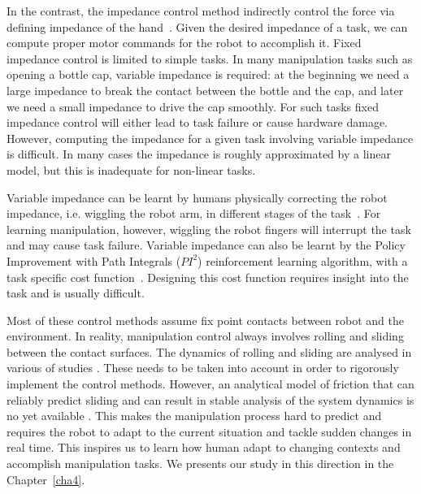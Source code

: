 In the contrast, the impedance control method indirectly control the force via defining impedance of the hand~\citep{howard2010transferring,wimbock2012comparison}. Given the desired impedance of a task, we can compute proper motor commands for the robot to accomplish it. Fixed impedance control is limited to simple tasks. In many manipulation tasks such as opening a bottle cap, variable impedance is required: at the beginning we need a large impedance to break the contact between the bottle and the cap, and later we need a small impedance to drive the cap smoothly. For such tasks fixed impedance control will either lead to task failure or cause hardware damage.
However, computing the impedance for a given task involving variable impedance is difficult.
In many cases the impedance is roughly approximated by a linear model, but this is inadequate for non-linear tasks.

Variable impedance can be learnt by humans physically correcting the robot impedance, i.e. wiggling the robot arm, in different stages of the task~\citep{kronander2012online}. For learning manipulation, however, wiggling the robot fingers will interrupt the task and may cause task failure.
Variable impedance can also be learnt by the Policy Improvement with Path Integrals ($PI^2$) reinforcement learning algorithm, with a task specific cost function~\citep{buchli2011learning}. Designing this cost function requires insight into the task and is usually difficult.

Most of these control methods assume fix point contacts between robot and the environment. In reality, manipulation control always involves rolling and sliding between the contact surfaces. The dynamics of rolling and sliding are analysed in various of studies \citep{howe1988sliding,montana1988kinematics}. These needs to be taken into account in order to rigorously implement the control methods. However, an analytical model of friction that can reliably predict sliding and can result in stable analysis of the system dynamics is no yet available \citep{bicchi2001robotic}. This makes the manipulation process hard to predict and requires the robot to adapt to the current situation and tackle sudden changes in real time. This inspires us to learn how human adapt to changing contexts and accomplish manipulation tasks. We presents our study in this direction in the Chapter~\ref{cha4}.



